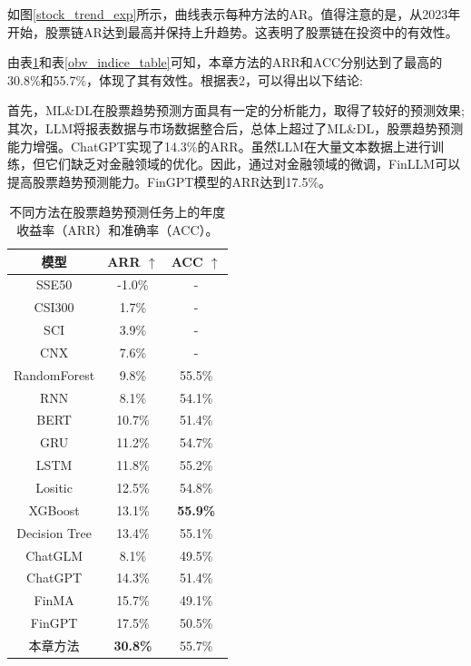 如图\ref{stock_trend_exp}所示，曲线表示每种方法的AR。值得注意的是，从2023年开始，股票链AR达到最高并保持上升趋势。这表明了股票链在投资中的有效性。

由表\ref{arr_acc_table}和表\ref{obv_indice_table}可知，本章方法的ARR和ACC分别达到了最高的30.8\%和55.7\%，体现了其有效性。根据表2，可以得出以下结论: 

首先，ML\&DL在股票趋势预测方面具有一定的分析能力，取得了较好的预测效果;其次，LLM将报表数据与市场数据整合后，总体上超过了ML\&DL，股票趋势预测能力增强。ChatGPT实现了14.3\%的ARR。虽然LLM在大量文本数据上进行训练，但它们缺乏对金融领域的优化。因此，通过对金融领域的微调，FinLLM可以提高股票趋势预测能力。FinGPT模型的ARR达到17.5\%。

\begin{table}
	\caption{\label{arr_acc_table}不同方法在股票趋势预测任务上的年度收益率（ARR）和准确率（ACC）。}
	\centering{}%
	\small 
	\begin{tabular}{ccc}
		\toprule[2pt]
		模型 & ARR $\uparrow$ & ACC $\uparrow$ \\
		\hline
		SSE50 & -1.0\% & - \\
		CSI300 & 1.7\% & - \\
		SCI & 3.9\% & - \\
		CNX & 7.6\% & - \\
		\hline
		RandomForest & 9.8\% & 55.5\% \\
		RNN & 8.1\% & 54.1\% \\
		BERT & 10.7\% & 51.4\% \\
		GRU & 11.2\% & 54.7\% \\
		LSTM & 11.8\% & 55.2\% \\
		Lositic & 12.5\% & 54.8\% \\
		XGBoost & 13.1\% & \textbf{55.9\%} \\
		Decision Tree & 13.4\% & 55.1\% \\
		\hline
		ChatGLM & 8.1\% & 49.5\% \\
		ChatGPT & 14.3\% & 51.4\% \\
		FinMA & 15.7\% & 49.1\% \\
		FinGPT & 17.5\% & 50.5\% \\
		\hline
		本章方法 & \textbf{30.8\%} & 55.7\% \\
		\bottomrule[2pt]
	\end{tabular}
\end{table}


